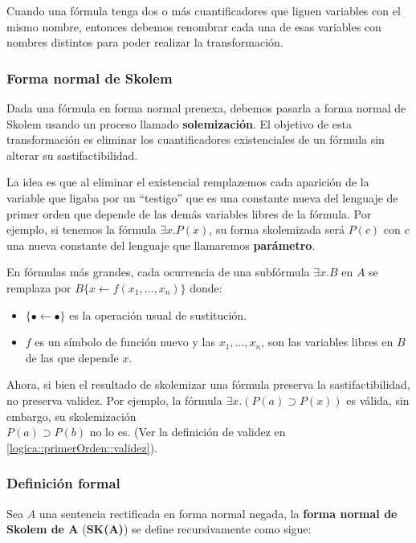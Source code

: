 Cuando una fórmula tenga dos o más cuantificadores que liguen variables con el mismo nombre, entonces debemos renombrar cada una de esas variables con nombres distintos para poder realizar la transformación.

\subsubsection{Forma normal de Skolem}
Dada una fórmula en forma normal prenexa, debemos pasarla a forma normal de Skolem usando un proceso llamado \textbf{solemización}. El objetivo de esta transformación es eliminar los cuantificadores existenciales de un fórmula sin alterar su sastifactibilidad.

La idea es que al eliminar el existencial remplazemos cada aparición de la variable que ligaba por un ``testigo'' que es una constante nueva del lenguaje de primer orden que depende de las demás variables libres de la fórmula. Por ejemplo, si tenemos la fórmula $\exists x.P(x)$, su forma skolemizada será $P(c)$ con $c$ una nueva constante del lenguaje que llamaremos \textbf{parámetro}. 

En fórmulas más grandes,  cada ocurrencia de una subfórmula $\exists x.B$ en $A$ se remplaza por $B\{ x \leftarrow f(x_1,\dots,x_n)\}$ donde:
\begin{itemize}
\item $\{\bullet \leftarrow \bullet\}$ es la operación usual de sustitución.
\item $f$ es un símbolo de función nuevo y las $x_1,\dots, x_n$, son las variables libres en $B$ de las que depende $x$.
\end{itemize} 

Ahora, si bien el resultado de skolemizar una fórmula preserva la sastifactibilidad, no preserva validez. Por ejemplo, la fórmula $\exists x.(P(a) \supset P(x))$ es válida, sin embargo, su skolemización \\ $P(a)\supset P(b)$ no lo es. (Ver la definición de validez en \ref{logica::primerOrden::validez}).

\subsubsection*{Definición formal}
Sea $A$ una sentencia rectificada en forma normal negada, la \textbf{forma normal de Skolem de A} (\textbf{SK(A)}) se define recursivamente como sigue:

